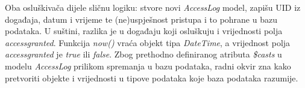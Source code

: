 Oba osluškivača dijele sličnu logiku: stvore novi \textit{AccessLog} model, zapišu UID iz događaja, datum i vrijeme te
(ne)uspješnost pristupa i to pohrane u bazu podataka.
U suštini, razlika je u događaju koji osluškuju i vrijednosti polja \textit{access\textunderscore granted}.
Funkcija \textit{now()} vraća objekt tipa \textit{DateTime}, a vrijednost polja \textit{access\textunderscore granted}
je \textit{true} ili \textit{false}.
Zbog prethodno definiranog atributa \textit{\$casts} u modelu \textit{AccessLog} prilikom spremanja u bazu podataka,
radni okvir zna kako pretvoriti objekte i vrijednosti u tipove podataka koje baza podataka razumije.

